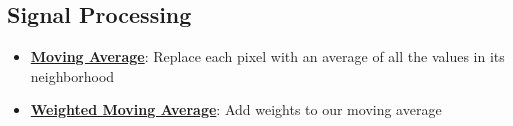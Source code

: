 \documentclass{article}%
\begin{document}
\subsection{Signal Processing}%
\label{subsec:SignalProcessing}%
\begin{itemize}[leftmargin=*]%
\item \href{https://purdue.brightspace.com/d2l/common/assets/pdfjs-d2l-dist/1.0.14-legacy/web/viewer.html?file=\%2Fcontent\%2Fenforced\%2F1095467-wl.202510.CS.24300.001\%2F07L2-Vision.pdf\%3Fou\%3D1095467\&lang=en-us\&container=d2l-fileviewer-rendered-pdf\&fullscreen=d2l-fileviewer-rendered-pdf-dialog\&height=667#page=38}{\textbf{Moving Average}}: Replace each pixel with an average of all the values in its neighborhood%
\item \href{https://purdue.brightspace.com/d2l/common/assets/pdfjs-d2l-dist/1.0.14-legacy/web/viewer.html?file=\%2Fcontent\%2Fenforced\%2F1095467-wl.202510.CS.24300.001\%2F07L2-Vision.pdf\%3Fou\%3D1095467\&lang=en-us\&container=d2l-fileviewer-rendered-pdf\&fullscreen=d2l-fileviewer-rendered-pdf-dialog\&height=667#page=40}{\textbf{Weighted Moving Average}}: Add weights to our moving average%
\end{itemize}

%
\end{document}

